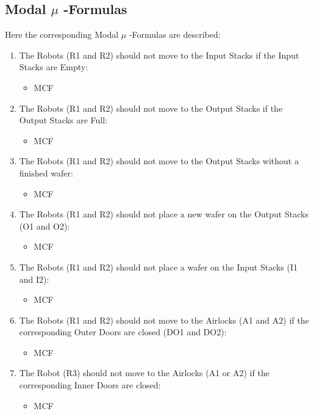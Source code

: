 \documentclass[a4paper,12pt]{article}
\begin{document}
\subsection{Modal $\mu$ -Formulas}
Here the corresponding Modal $\mu$ -Formulas are described:
\begin{enumerate}
\item The Robots (R1 and R2) should not move to the Input Stacks if the Input Stacks are Empty:
    \begin{itemize}
	\item MCF
	\end{itemize}
\item The Robots (R1 and R2) should not move to the Output Stacks if the Output Stacks are Full:
    \begin{itemize}
	\item MCF
	\end{itemize}
\item The Robots (R1 and R2) should not move to the Output Stacks without a finished wafer:
    \begin{itemize}
	\item MCF
	\end{itemize}
\item The Robots (R1 and R2) should not place a new wafer on the Output Stacks (O1 and O2):
    \begin{itemize}
	\item MCF
	\end{itemize}
\item The Robots (R1 and R2) should not place a wafer on the Input Stacks (I1 and I2):
    \begin{itemize}
	\item MCF
	\end{itemize}
\item The Robots (R1 and R2) should not move to the Airlocks (A1 and A2) if the corresponding Outer Doors are closed (DO1 and DO2):
    \begin{itemize}
	\item MCF
	\end{itemize}
\item The Robot (R3) should not move to the Airlocks (A1 or A2) if the corresponding Inner Doors are closed:
    \begin{itemize}
	\item MCF
	\end{itemize}

\end{enumerate}
\end{document}
